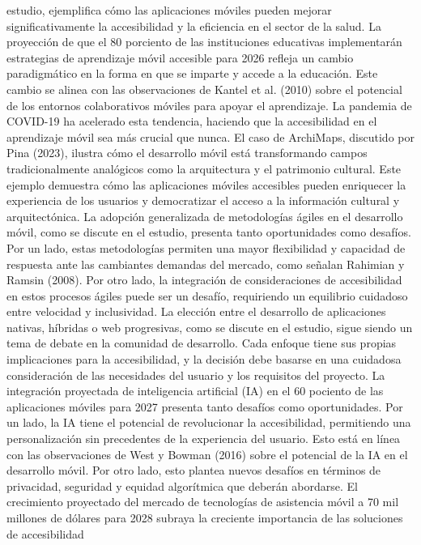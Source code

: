 \documentclass[12pt]{article}
\begin{document}
estudio, ejemplifica cómo las aplicaciones móviles pueden mejorar significativamente la accesibilidad y la eficiencia en el sector de la salud.
La proyección de que el 80 porciento de las instituciones educativas implementarán estrategias de aprendizaje móvil accesible para 2026 refleja un cambio paradigmático en la forma en que se imparte y accede a la educación. Este cambio se alinea con las observaciones de Kantel et al. (2010) sobre el potencial de los entornos colaborativos móviles para apoyar el aprendizaje. La pandemia de COVID-19 ha acelerado esta tendencia, haciendo que la accesibilidad en el aprendizaje móvil sea más crucial que nunca.
El caso de ArchiMaps, discutido por Pina (2023), ilustra cómo el desarrollo móvil está transformando campos tradicionalmente analógicos como la arquitectura y el patrimonio cultural. Este ejemplo demuestra cómo las aplicaciones móviles accesibles pueden enriquecer la experiencia de los usuarios y democratizar el acceso a la información cultural y arquitectónica.
La adopción generalizada de metodologías ágiles en el desarrollo móvil, como se discute en el estudio, presenta tanto oportunidades como desafíos. Por un lado, estas metodologías permiten una mayor flexibilidad y capacidad de respuesta ante las cambiantes demandas del mercado, como señalan Rahimian y Ramsin (2008). Por otro lado, la integración de consideraciones de accesibilidad en estos procesos ágiles puede ser un desafío, requiriendo un equilibrio cuidadoso entre velocidad y inclusividad.
La elección entre el desarrollo de aplicaciones nativas, híbridas o web progresivas, como se discute en el estudio, sigue siendo un tema de debate en la comunidad de desarrollo. Cada enfoque tiene sus propias implicaciones para la accesibilidad, y la decisión debe basarse en una cuidadosa consideración de las necesidades del usuario y los requisitos del proyecto.
La integración proyectada de inteligencia artificial (IA) en el 60 pociento de las aplicaciones móviles para 2027 presenta tanto desafíos como oportunidades. Por un lado, la IA tiene el potencial de revolucionar la accesibilidad, permitiendo una personalización sin precedentes de la experiencia del usuario. Esto está en línea con las observaciones de West y Bowman (2016) sobre el potencial de la IA en el desarrollo móvil. Por otro lado, esto plantea nuevos desafíos en términos de privacidad, seguridad y equidad algorítmica que deberán abordarse.
El crecimiento proyectado del mercado de tecnologías de asistencia móvil a 70 mil millones de dólares para 2028 subraya la creciente importancia de las soluciones de accesibilidad
 
\end{document}
